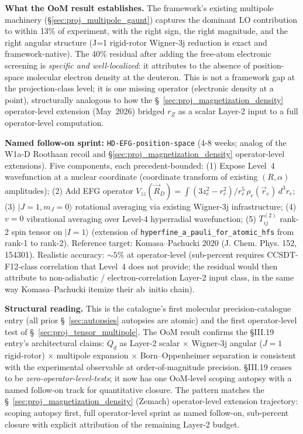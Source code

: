 \documentclass[11pt]{article}
\begin{document}
\textbf{What the OoM result establishes.}  The framework's existing
multipole machinery (\S\ref{sec:proj_multipole_gaunt}) captures
the dominant LO contribution to within 13\% of experiment, with
the right sign, the right magnitude, and the right angular
structure (J=1 rigid-rotor Wigner-3j reduction is exact and
framework-native).  The 40\% residual after adding the free-atom
electronic screening is \emph{specific and well-localized}: it
attributes to the absence of position-space molecular electron
density at the deuteron.  This is not a framework gap at the
projection-class level; it is one missing operator (electronic
density at a point), structurally analogous to how the
\S~\ref{sec:proj_magnetization_density} operator-level extension
(May~2026) bridged $r_Z$ as a scalar Layer-2 input to a full
operator-level computation.

\textbf{Named follow-on sprint:} \texttt{HD-EFG-position-space}
(4-8 weeks; analog of the W1a-D Roothaan recoil and
\S\ref{sec:proj_magnetization_density} operator-level extensions).
Five components, each precedent-bounded:
(1) Expose Level~4 wavefunction at a nuclear coordinate
(coordinate transform of existing $(R, \alpha)$ amplitudes);
(2) Add EFG operator $V_{zz}(\vec{R}_D) = \int (3 z_e^2 - r_e^2)/r_e^5
\, \rho_e(\vec{r}_e)\,d^3 r_e$;
(3) $|J=1, m_J=0\rangle$ rotational averaging via existing Wigner-3j
infrastructure;
(4) $v=0$ vibrational averaging over Level-4 hyperradial wavefunction;
(5) $T^{(2)}_{ij}$ rank-2 spin tensor on $|I=1\rangle$ (extension of
\texttt{hyperfine\_a\_pauli\_for\_atomic\_hfs} from rank-1 to rank-2).
Reference target: Komasa--Pachucki 2020 (J. Chem. Phys. 152, 154301).
Realistic accuracy: $\sim 5\%$ at operator-level (sub-percent requires
CCSDT-F12-class correlation that Level~4 does not provide; the
residual would then attribute to non-adiabatic / electron-correlation
Layer-2 input class, in the same way Komasa--Pachucki itemize their
ab~initio chain).

\textbf{Structural reading.}  This is the catalogue's first
molecular precision-catalogue entry (all prior \S~\ref{sec:autopsies}
autopsies are atomic) and the first operator-level test of
\S~\ref{sec:proj_tensor_multipole}.  The OoM result confirms the
\S III.19 entry's architectural claims: $Q_d$ as Layer-2 scalar
$\times$ Wigner-3j angular ($J=1$ rigid-rotor) $\times$ multipole
expansion $\times$ Born--Oppenheimer separation is consistent with
the experimental observable at order-of-magnitude precision.
\S III.19 ceases to be \emph{zero-operator-level-tests}; it now
has one OoM-level scoping autopsy with a named follow-on track for
quantitative closure.  The pattern matches the
\S~\ref{sec:proj_magnetization_density} (Zemach) operator-level
extension trajectory: scoping autopsy first, full operator-level
sprint as named follow-on, sub-percent closure with explicit
attribution of the remaining Layer-2 budget.
\end{document}
